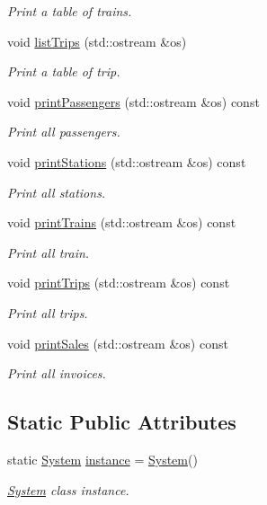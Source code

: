 \begin{DoxyCompactItemize}
\begin{DoxyCompactList}\small\item\em Print a table of trains. \end{DoxyCompactList}\item 
void \mbox{\hyperlink{classSystem_af11f201f6417c2658f35238d98c6f032}{list\+Trips}} (std\+::ostream \&os)
\begin{DoxyCompactList}\small\item\em Print a table of trip. \end{DoxyCompactList}\item 
void \mbox{\hyperlink{classSystem_a1c5753d5c70d15dc3fe56fd5e421ba76}{print\+Passengers}} (std\+::ostream \&os) const
\begin{DoxyCompactList}\small\item\em Print all passengers. \end{DoxyCompactList}\item 
void \mbox{\hyperlink{classSystem_ac4b65c4fe2628e7d35b1027161e9d1da}{print\+Stations}} (std\+::ostream \&os) const
\begin{DoxyCompactList}\small\item\em Print all stations. \end{DoxyCompactList}\item 
void \mbox{\hyperlink{classSystem_af4610f38d80e01a18f2083a7c5fbd5ce}{print\+Trains}} (std\+::ostream \&os) const
\begin{DoxyCompactList}\small\item\em Print all train. \end{DoxyCompactList}\item 
void \mbox{\hyperlink{classSystem_abaa61b6377abcfc61da32092e5d734d9}{print\+Trips}} (std\+::ostream \&os) const
\begin{DoxyCompactList}\small\item\em Print all trips. \end{DoxyCompactList}\item 
void \mbox{\hyperlink{classSystem_aaad47fd0e1bf746a0bed32feb9553e53}{print\+Sales}} (std\+::ostream \&os) const
\begin{DoxyCompactList}\small\item\em Print all invoices. \end{DoxyCompactList}\end{DoxyCompactItemize}
\subsection*{Static Public Attributes}
\begin{DoxyCompactItemize}
\item 
static \mbox{\hyperlink{classSystem}{System}} \mbox{\hyperlink{classSystem_a40d348884d1b737ecd26b4bc6509bf48}{instance}} = \mbox{\hyperlink{classSystem}{System}}()
\begin{DoxyCompactList}\small\item\em \mbox{\hyperlink{classSystem}{System}} class instance. \end{DoxyCompactList}\end{DoxyCompactItemize}
